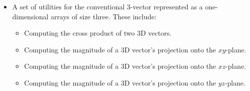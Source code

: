 \documentclass[11pt,fleqn]{report}
\begin{document}
\begin{itemize}
\begin{itemize}
to produce a \textit{mxp} matrix.
\item Multiplying the transpose of a \textit{mxn} matrix with
a \textit{mxp} matrix to produce a \textit{nxp} matrix.
\item Multiplying a \textit{mxn} matrix with the transpose of a
\textit{pxn} matrix to produce a \textit{mxp} matrix.
\item Multiplying the transpose of a \textit{mxn} matrix with
the transpose of a \textit{pxm} matrix to produce a
\textit{nxp} matrix.
\item Transforming a \textit{mxm} matrix, $A$, by application of a
\textit{nxm} transformation matrix, $T$ to produce a \textit{nxn} 
matrix, B with $B = T A T'$
\item Transforming a \textit{mxm} matrix, $A$, by application of a
\textit{mxn} inverse transformation matrix, $T$ to produce a \textit{nxn} 
matrix, B with $B = T' A T$
\item Inverting a \textit{mxm} matrix. This process uses the
Cholesky decomposition so the matrix must be
symmetric and positive-definite.
\end{itemize}

\item A set of utilities for the conventional 3-vector represented as a one-dimensional 
arrays of size three. These include:
\begin{itemize}
\item Computing the cross product of two 3D vectors.
\item Computing the magnitude of a 3D vector's projection onto the $xy$-plane.
\item Computing the magnitude of a 3D vector's projection onto the $xz$-plane.
\item Computing the magnitude of a 3D vector's projection onto the $yz$-plane.
\end{itemize}
\end{itemize}
\end{document}
